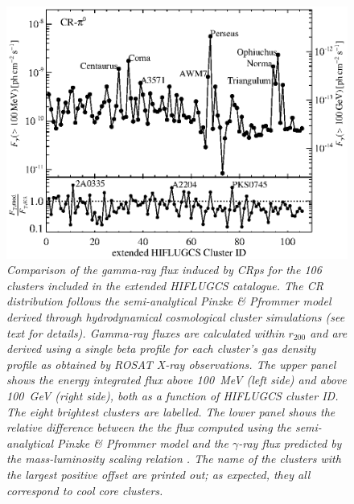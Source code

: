 \documentclass[10pt,aps,pra,reprint,amsmath,amsfonts,amssymb,showpacs,nofootinbib,floatfix]{revtex4-1}
\newcommand{\rvir}{r_{200}}
\begin{document}
\begin{figure}%
\begin{minipage}{2.0\columnwidth}
 \includegraphics[width=0.99\columnwidth]{figures/Flux.comp.CR.eps}
 \caption{\it Comparison of the gamma-ray flux induced by CRps for the
   106 clusters included in the extended HIFLUGCS catalogue.  The CR
   distribution follows the semi-analytical Pinzke \& Pfrommer model
   derived through hydrodynamical cosmological cluster simulations
   \cite{2010MNRAS.409..449P} (see text for details).  Gamma-ray
   fluxes are calculated within $\rvir$ and are derived using a single
   beta profile for each cluster's gas density profile as obtained by
   ROSAT X-ray observations. The upper panel shows the energy
   integrated flux above 100~MeV (left side) and above 100~GeV (right
   side), both as a function of HIFLUGCS cluster ID. The eight
   brightest clusters are labelled. The lower panel shows the relative
   difference between the the flux computed using the semi-analytical
   Pinzke \& Pfrommer model and the $\gamma$-ray flux predicted by the
   mass-luminosity scaling relation \cite{2010MNRAS.409..449P}. The
   name of the clusters with the largest positive offset are printed
   out; as expected, they all correspond to cool core clusters.}
 \label{fig19}
\end{minipage}
\end{figure}
\end{document}
